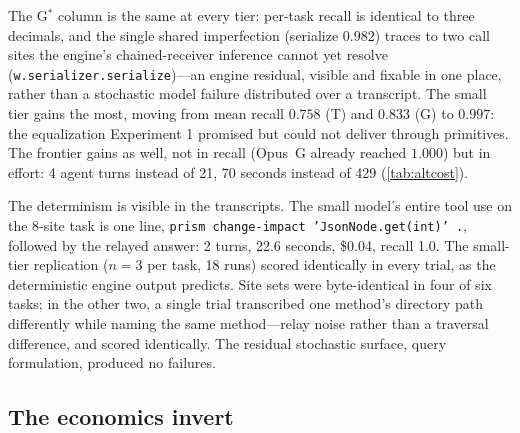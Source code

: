 \documentclass[11pt]{article}
\newcommand{\code}[1]{\texttt{#1}}
\newcommand{\gstar}{G$^{*}$}
\begin{document}
The \gstar{} column is the same at every tier: per-task recall is identical to
three decimals, and the single shared imperfection (serialize $0.982$) traces
to two call sites the engine's chained-receiver inference cannot yet resolve
(\code{w.serializer.serialize})---an engine residual, visible and fixable in
one place, rather than a stochastic model failure distributed over a
transcript. The small tier gains the most, moving from mean recall $0.758$ (T)
and $0.833$ (G) to $0.997$: the equalization Experiment 1 promised but could
not deliver through primitives. The frontier gains as well, not in recall
(Opus~G already reached $1.000$) but in effort: 4 agent turns instead of 21,
70 seconds instead of 429 (\cref{tab:altcost}).

The determinism is visible in the transcripts. The small model's entire tool use
on the 8-site task is one line,
\code{prism change-impact 'JsonNode.get(int)' .}, followed by the relayed
answer: 2 turns, 22.6 seconds, \$0.04, recall 1.0. The small-tier replication
($n{=}3$ per task, 18 runs) scored identically in every trial, as the
deterministic engine output predicts. Site sets were byte-identical in four of
six tasks; in the other two, a single trial transcribed one method's directory
path differently while naming the same method---relay noise rather than a
traversal difference, and scored identically. The residual stochastic surface,
query formulation, produced no failures.

\subsection{The economics invert}
\label{sec:alt-econ}
\end{document}
